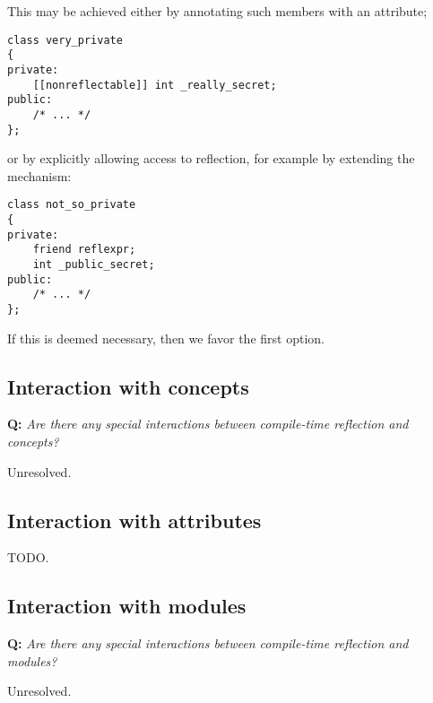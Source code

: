 This may be achieved either by annotating such members with an attribute;

\begin{verbatim}
class very_private
{
private:
	[[nonreflectable]] int _really_secret;
public:
	/* ... */
};
\end{verbatim}

or by explicitly allowing access to reflection, for example by extending
the \verb@friend@ mechanism:

\begin{verbatim}
class not_so_private
{
private:
	friend reflexpr;
	int _public_secret;
public:
	/* ... */
};
\end{verbatim}

If this is deemed necessary, then we favor the first option.

\subsection{Interaction with concepts}

\textbf{Q:} {\em Are there any special interactions between compile-time
reflection and concepts?}

Unresolved.

\subsection{Interaction with attributes}

TODO.

\subsection{Interaction with modules}

\textbf{Q:} {\em Are there any special interactions between compile-time
reflection and modules?}

Unresolved.

